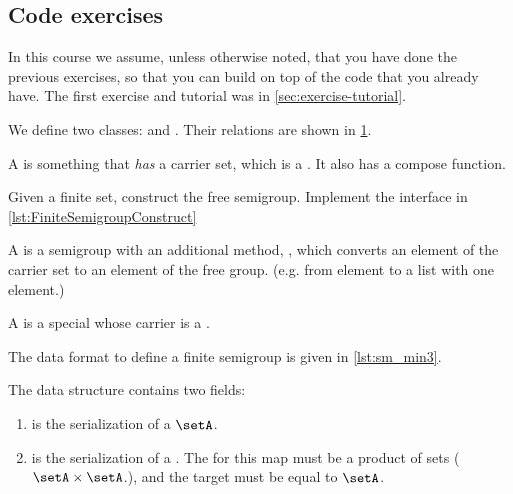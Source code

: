 \subsection{Code exercises}

\begin{remark}
    In this course we assume, unless otherwise noted, that you have done the previous exercises, so that you can build on top of the code that you already have. The first exercise and tutorial was in \cref{sec:exercise-tutorial}.
\end{remark}

\begin{figure*}[b]
    \label{fig:uml_semigroup}
\end{figure*}

We define two classes: \Semigroup and \FiniteSemigroup.
Their relations are shown in \cref{fig:uml_semigroup}.

A \Semigroup is something that \emph{has} a carrier set, which is a \Setoid.
It also has a compose function.



\begin{codeexercise}
    \label{ex:TestFiniteSemigroupConstruct}
    Given a finite set, construct the free semigroup.
    Implement the interface in \cref{lst:FiniteSemigroupConstruct}
\end{codeexercise}


A \FreeSemigroup is a semigroup with an additional method, , which converts an element of the carrier set to an element of the free group. (e.g. from element to a list with one element.)




A \FiniteSemigroup is a special \Semigroup whose carrier is a \FiniteSet.




The data format to define a finite semigroup is given in \cref{lst:sm_min3}.

The data structure contains two fields:
\begin{enumerate}
    \item {} is the serialization of a \FiniteSet $\setA$.
    \item {} is the serialization of a \FiniteMap. The 
    for this map must be a product of sets ($\setA \times \setA$.), and the target
    must be equal to $\setA$.
\end{enumerate}


